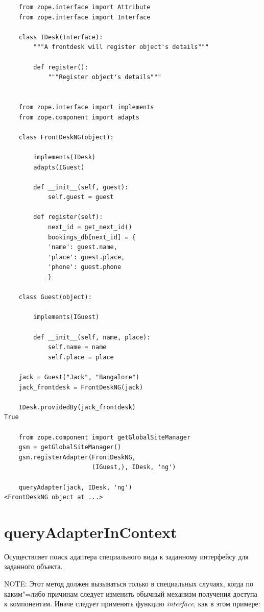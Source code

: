 \documentclass[a4paper,openany,twoside,final]{book}
\providecommand*{\DUroletitlereference}[1]{\textsl{#1}}
\begin{document}
\begin{verbatim}
    from zope.interface import Attribute
    from zope.interface import Interface

    class IDesk(Interface):
        """A frontdesk will register object's details"""

        def register():
            """Register object's details"""


    from zope.interface import implements
    from zope.component import adapts

    class FrontDeskNG(object):

        implements(IDesk)
        adapts(IGuest)

        def __init__(self, guest):
            self.guest = guest

        def register(self):
            next_id = get_next_id()
            bookings_db[next_id] = {
            'name': guest.name,
            'place': guest.place,
            'phone': guest.phone
            }

    class Guest(object):

        implements(IGuest)

        def __init__(self, name, place):
            self.name = name
            self.place = place

    jack = Guest("Jack", "Bangalore")
    jack_frontdesk = FrontDeskNG(jack)

    IDesk.providedBy(jack_frontdesk)
True

    from zope.component import getGlobalSiteManager
    gsm = getGlobalSiteManager()
    gsm.registerAdapter(FrontDeskNG,
                        (IGuest,), IDesk, 'ng')

    queryAdapter(jack, IDesk, 'ng')
<FrontDeskNG object at ...>
\end{verbatim}


\section*{queryAdapterInContext%
  \label{queryadapterincontext}%
}

Осуществляет поиск адаптера специального вида к заданному интерфейсу для заданного объекта.

NOTE: Этот метод должен вызываться только в специальных случаях, когда по каким"=либо причинам следует изменить обычный механизм получения доступа к компонентам.  Иначе следует применять функцию \DUroletitlereference{interface}, как в этом примере:
\end{document}
